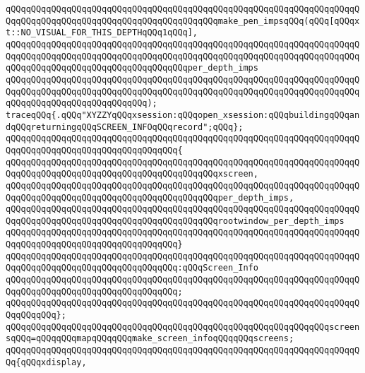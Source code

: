 \verb|qQQqqQQqqQQqqQQqqQQqqQQqqQQqqQQqqQQqqQQqqQQqqQQqqQQqqQQqqQQqqQQqqQQqqQQqqQQqqQQqqQQqqQQqqQQqqQQqqQQqqQQqqQQqqQQqmake_pen_impsqQQq(qQQq[qQQqxt::NO_VISUAL_FOR_THIS_DEPTHqQQq1qQQq],|\newline
\verb|qQQqqQQqqQQqqQQqqQQqqQQqqQQqqQQqqQQqqQQqqQQqqQQqqQQqqQQqqQQqqQQqqQQqqQQqqQQqqQQqqQQqqQQqqQQqqQQqqQQqqQQqqQQqqQQqqQQqqQQqqQQqqQQqqQQqqQQqqQQqqQQqqQQqqQQqqQQqqQQqqQQqqQQqqQQqqQQqper_depth_imps|\newline
\verb|qQQqqQQqqQQqqQQqqQQqqQQqqQQqqQQqqQQqqQQqqQQqqQQqqQQqqQQqqQQqqQQqqQQqqQQqqQQqqQQqqQQqqQQqqQQqqQQqqQQqqQQqqQQqqQQqqQQqqQQqqQQqqQQqqQQqqQQqqQQqqQQqqQQqqQQqqQQqqQQqqQQqqQQq);|\newline
\newline
\verb|traceqQQq{.qQQq"XYZZYqQQqxsession:qQQqopen_xsession:qQQqbuildingqQQqandqQQqreturningqQQqSCREEN_INFOqQQqrecord";qQQq};|\newline
\verb|qQQqqQQqqQQqqQQqqQQqqQQqqQQqqQQqqQQqqQQqqQQqqQQqqQQqqQQqqQQqqQQqqQQqqQQqqQQqqQQqqQQqqQQqqQQqqQQqqQQqqQQq{|\newline
\verb|qQQqqQQqqQQqqQQqqQQqqQQqqQQqqQQqqQQqqQQqqQQqqQQqqQQqqQQqqQQqqQQqqQQqqQQqqQQqqQQqqQQqqQQqqQQqqQQqqQQqqQQqqQQqqQQqxscreen,|\newline
\verb|qQQqqQQqqQQqqQQqqQQqqQQqqQQqqQQqqQQqqQQqqQQqqQQqqQQqqQQqqQQqqQQqqQQqqQQqqQQqqQQqqQQqqQQqqQQqqQQqqQQqqQQqqQQqqQQqper_depth_imps,|\newline
\verb|qQQqqQQqqQQqqQQqqQQqqQQqqQQqqQQqqQQqqQQqqQQqqQQqqQQqqQQqqQQqqQQqqQQqqQQqqQQqqQQqqQQqqQQqqQQqqQQqqQQqqQQqqQQqqQQqrootwindow_per_depth_imps|\newline
\verb|qQQqqQQqqQQqqQQqqQQqqQQqqQQqqQQqqQQqqQQqqQQqqQQqqQQqqQQqqQQqqQQqqQQqqQQqqQQqqQQqqQQqqQQqqQQqqQQqqQQqqQQq}|\newline
\verb|qQQqqQQqqQQqqQQqqQQqqQQqqQQqqQQqqQQqqQQqqQQqqQQqqQQqqQQqqQQqqQQqqQQqqQQqqQQqqQQqqQQqqQQqqQQqqQQqqQQqqQQq:qQQqScreen_Info|\newline
\verb|qQQqqQQqqQQqqQQqqQQqqQQqqQQqqQQqqQQqqQQqqQQqqQQqqQQqqQQqqQQqqQQqqQQqqQQqqQQqqQQqqQQqqQQqqQQqqQQqqQQqqQQq;|\newline
\verb|qQQqqQQqqQQqqQQqqQQqqQQqqQQqqQQqqQQqqQQqqQQqqQQqqQQqqQQqqQQqqQQqqQQqqQQqqQQqqQQq};|\newline
\newline
\verb|qQQqqQQqqQQqqQQqqQQqqQQqqQQqqQQqqQQqqQQqqQQqqQQqqQQqqQQqqQQqqQQqscreensqQQq=qQQqqQQqmapqQQqqQQqmake_screen_infoqQQqqQQqscreens;|\newline
\newline
\verb|qQQqqQQqqQQqqQQqqQQqqQQqqQQqqQQqqQQqqQQqqQQqqQQqqQQqqQQqqQQqqQQqqQQqqQQq{qQQqxdisplay,|\newline

